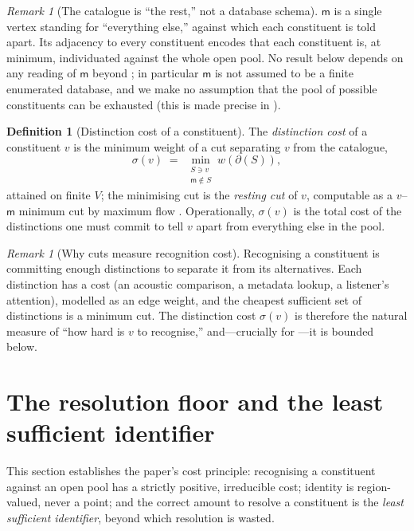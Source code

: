 \documentclass[11pt,twocolumn,a4paper]{article}
\theoremstyle{thmstyle}
\theoremstyle{definition}
\newtheorem{definition}[theorem]{Definition}
\theoremstyle{remark}
\newtheorem{remark}[theorem]{Remark}
\newcommand{\V}{V}
\newcommand{\wt}{w}
\newcommand{\med}{\mathsf{m}}
\newcommand{\cut}{\partial}
\newcommand{\str}{\sigma}
\begin{document}
\begin{remark}[The catalogue is ``the rest,'' not a database schema]
\label{rem:catalogue}
$\med$ is a single vertex standing for ``everything else,'' against which each
constituent is told apart. Its adjacency to every constituent encodes that each
constituent is, at minimum, individuated against the whole open pool. No result
below depends on any reading of $\med$ beyond ; in particular
$\med$ is not assumed to be a finite enumerated database, and we make no
assumption that the pool of possible constituents can be exhausted (this is made
precise in ).
\end{remark}

\begin{definition}[Distinction cost of a constituent]
\label{def:sepcost}
The \emph{distinction cost} of a constituent $v$ is the minimum weight of a cut
separating $v$ from the catalogue,
\[
\str(v)\;=\;\min_{\substack{S\ni v\\ \med\notin S}}\wt(\cut(S)),
\]
attained on finite $\V$; the minimising cut is the \emph{resting cut} of $v$,
computable as a $v$--$\med$ minimum cut by maximum flow
\citep{fordfulkerson1956,menger1927,stoer1997mincut}. Operationally, $\str(v)$
is the total cost of the distinctions one must commit to tell $v$ apart from
everything else in the pool.
\end{definition}

\begin{remark}[Why cuts measure recognition cost]
\label{rem:why-cuts}
Recognising a constituent is committing enough distinctions to separate it from
its alternatives. Each distinction has a cost (an acoustic comparison, a
metadata lookup, a listener's attention), modelled as an edge weight, and the
cheapest sufficient set of distinctions is a minimum cut. The distinction cost
$\str(v)$ is therefore the natural measure of ``how hard is $v$ to recognise,''
and---crucially for ---it is bounded below.
\end{remark}

\section{The resolution floor and the least sufficient identifier}
\label{sec:floor}

This section establishes the paper's cost principle: recognising a constituent
against an open pool has a strictly positive, irreducible cost; identity is
region-valued, never a point; and the correct amount to resolve a constituent is
the \emph{least sufficient identifier}, beyond which resolution is wasted.
\end{document}
